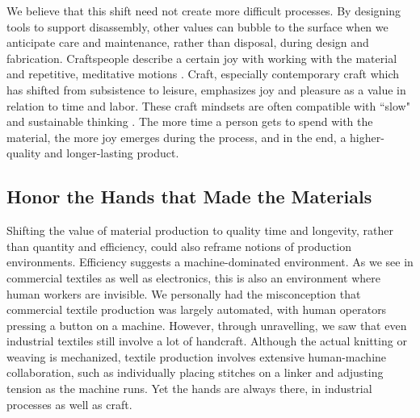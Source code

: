 We believe that this shift need not create more difficult processes. By designing tools to support disassembly, other values can bubble to the surface when we anticipate care and maintenance, rather than disposal, during design and fabrication. Craftspeople describe a certain joy with working with the material and repetitive, meditative motions \cite{pye_nature_2007, fletcher_craft_2016, nitsche_when_2019}. Craft, especially contemporary craft which has shifted from subsistence to leisure, emphasizes joy and pleasure as a value in relation to time and labor. These craft mindsets are often compatible with ``slow" and sustainable thinking \cite{pan_fashion_2014, phelan_what_2017}. The more time a person gets to spend with the material, the more joy emerges during the process, and in the end, a higher-quality and longer-lasting product.

\subsection{Honor the Hands that Made the Materials}

Shifting the value of material production to quality time and longevity, rather than quantity and efficiency, could also reframe notions of production environments. Efficiency suggests a machine-dominated environment. As we see in commercial textiles as well as electronics, this is also an environment where human workers are invisible. We personally had the misconception that commercial textile production was largely automated, with human operators pressing a button on a machine. However, through unravelling, we saw that even industrial textiles still involve a lot of handcraft. Although the actual knitting or weaving is mechanized, textile production involves extensive human-machine collaboration, such as individually placing stitches on a linker and adjusting tension as the machine runs. \cite{engineers_complete_2017} Yet the hands are always there, in industrial processes as well as craft. 

